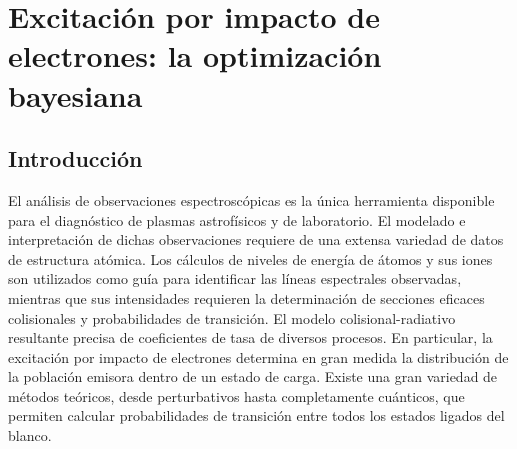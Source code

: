 \chapter{Excitación por impacto de electrones: la optimización bayesiana}
\label{chap:bayeopt}

\begin{comment}

Como no estas poniendo nada relacionado a Powell, me imagino que
este dio bien y no te queres echar tierra. Si no es asi, es
necesario que expliques como se hace hoy, y que estas proponiendo
para mejorarlo.

Luego, podes explicar la optimizacion Bayesiana (o lo mandas a un apendice),
recalcando que no estas optimizando una funcion matematica (por mas
que en este caso, si lo estes haciendo...).
Finalmente, van los resultados, pero con graficos que sean mas claros.
Los que vi son demasiado especificos, demasiado tecnicos y engorrosos.

Tenes que explicar un poquito la forma de la seccion eficaz,
o del collision strength, explicar que son esas resonancias,
cual es la forma que se espera obtener, que cosa esta bien y
que mal, y que tan dificil es llegar a estos resultados.

Finalmente, el estilo de escritura es de receta de cocina.
No es una lista de actividades. Es un relato. Acompaña al lector,
llevalo por las diferentes ideas, creale un interes, una
tension, mas misterio y mas poesia. (!)

\end{comment}

\section{Introducción}
\label{sec:intro}

El análisis de observaciones espectroscópicas es la única herramienta 
disponible para el diagnóstico de plasmas astrofísicos y de laboratorio. 
El modelado e interpretación de dichas observaciones requiere de una 
extensa variedad de datos de estructura atómica. Los cálculos de niveles 
de energía de átomos y sus iones son utilizados como guía para 
identificar las líneas espectrales observadas, mientras que sus 
intensidades requieren la determinación de secciones eficaces 
colisionales y probabilidades de transición. El modelo 
colisional-radiativo resultante precisa de coeficientes de tasa de 
diversos procesos. En particular, la excitación por impacto de 
electrones determina en gran medida la distribución de la población 
emisora dentro de un estado de carga. Existe una gran variedad de 
métodos teóricos, desde perturbativos hasta completamente cuánticos, que 
permiten calcular probabilidades de transición entre todos los estados 
ligados del blanco.

